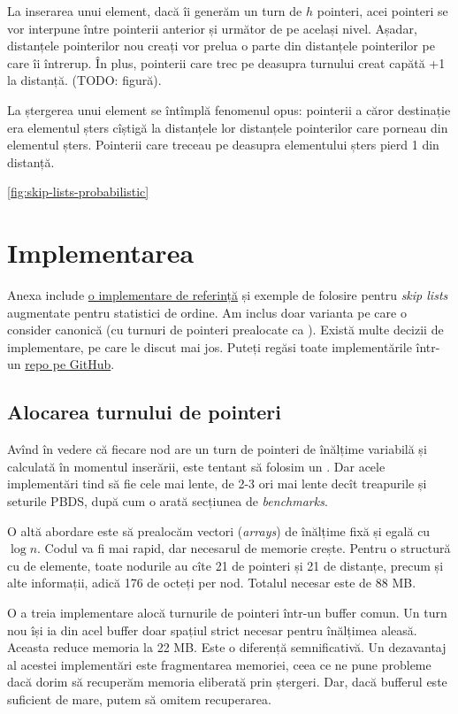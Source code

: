 \documentclass[../main.tex]{subfiles}
\begin{document}
La inserarea unui element, dacă îi generăm un turn de $h$ pointeri, acei pointeri se vor interpune între pointerii anterior și următor de pe același nivel. Așadar, distanțele pointerilor nou creați vor prelua o parte din distanțele pointerilor pe care îi întrerup. În plus, pointerii care trec pe deasupra turnului creat capătă +1 la distanță. (TODO: figură).

La ștergerea unui element se întîmplă fenomenul opus: pointerii a căror destinație era elementul șters cîștigă la distanțele lor distanțele pointerilor care porneau din elementul șters. Pointerii care treceau pe deasupra elementului șters pierd 1 din distanță.

\ref{fig:skip-lists-probabilistic}


\section{Implementarea}

\label{problem:skip-lists}

Anexa include \hyperref[code:skip-lists]{o implementare de referință} și exemple de folosire pentru \textit{skip lists} augmentate pentru statistici de ordine. Am inclus doar varianta pe care o consider canonică (cu turnuri de pointeri prealocate ca ). Există multe decizii de implementare, pe care le discut mai jos. Puteți regăsi toate implementările într-un \href{https://github.com/CatalinFrancu/nerdvana/tree/main/balanced-ds}{repo pe GitHub}.


\subsection{Alocarea turnului de pointeri}

Avînd în vedere că fiecare nod are un turn de pointeri de înălțime variabilă și calculată în momentul inserării, este tentant să folosim un . Dar acele implementări tind să fie cele mai lente, de 2-3 ori mai lente decît treapurile și seturile PBDS, după cum o arată secțiunea de \textit{benchmarks}.

O altă abordare este să prealocăm vectori (\textit{arrays}) de înălțime fixă și egală cu $\log n$. Codul va fi mai rapid, dar necesarul de memorie crește. Pentru o structură cu  de elemente, toate nodurile au cîte 21 de pointeri și 21 de distanțe, precum și alte informații, adică 176 de octeți per nod. Totalul necesar este de 88 MB.

O a treia implementare alocă turnurile de pointeri într-un buffer comun. Un turn nou își ia din acel buffer doar spațiul strict necesar pentru înălțimea aleasă. Aceasta reduce memoria la 22 MB. Este o diferență semnificativă. Un dezavantaj al acestei implementări este fragmentarea memoriei, ceea ce ne pune probleme dacă dorim să recuperăm memoria eliberată prin ștergeri. Dar, dacă bufferul este suficient de mare, putem să omitem recuperarea.
\end{document}
